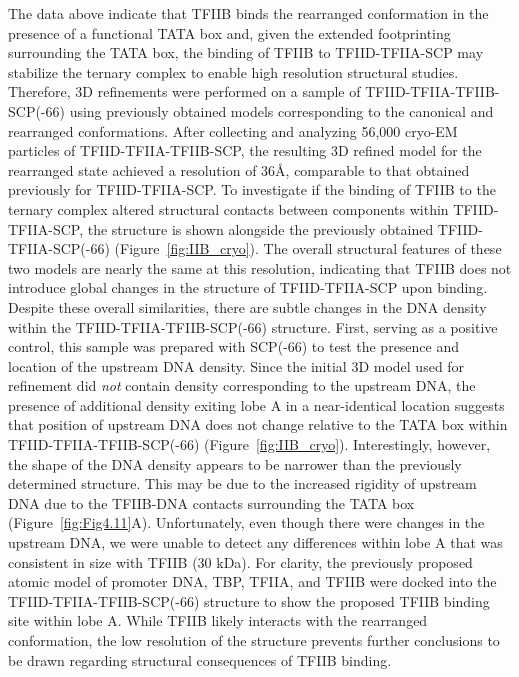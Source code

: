 \indent The data above indicate that TFIIB binds the rearranged conformation in the presence of a functional TATA box and, given the extended footprinting surrounding the TATA box, the binding of TFIIB to TFIID-TFIIA-SCP may stabilize the ternary complex to enable high resolution structural studies. Therefore, 3D refinements were performed on a sample of TFIID-TFIIA-TFIIB-SCP(-66) using previously obtained models corresponding to the canonical and rearranged conformations. After collecting and analyzing 56,000 cryo-EM particles of TFIID-TFIIA-TFIIB-SCP, the resulting 3D refined model for the rearranged state achieved a resolution of 36\AA, comparable to that obtained previously for TFIID-TFIIA-SCP. To investigate if the binding of TFIIB to the ternary complex altered structural contacts between components within TFIID-TFIIA-SCP, the structure is shown alongside the previously obtained TFIID-TFIIA-SCP(-66) (Figure~\ref{fig:IIB_cryo}). The overall structural features of these two models are nearly the same at this resolution, indicating that TFIIB does not introduce global changes in the structure of TFIID-TFIIA-SCP upon binding. \\
\indent Despite these overall similarities, there are subtle changes in the DNA density within the TFIID-TFIIA-TFIIB-SCP(-66) structure. First, serving as a positive control, this sample was prepared with SCP(-66) to test the presence and location of the upstream DNA density. Since the initial 3D model used for refinement did \emph{not} contain density corresponding to the upstream DNA, the presence of additional density exiting lobe A in a near-identical location suggests that position of upstream DNA does not change relative to the TATA box within TFIID-TFIIA-TFIIB-SCP(-66) (Figure~\ref{fig:IIB_cryo}). Interestingly, however, the shape of the DNA density appears to be narrower than the previously determined structure. This may be due to the increased rigidity of upstream DNA due to the TFIIB-DNA contacts surrounding the TATA box (Figure~\ref{fig:Fig4.11}A). Unfortunately, even though there were changes in the upstream DNA, we were unable to detect any differences within lobe A that was consistent in size with TFIIB (30 kDa). For clarity, the previously proposed atomic model of promoter DNA, TBP, TFIIA, and TFIIB were docked into the TFIID-TFIIA-TFIIB-SCP(-66) structure to show the proposed TFIIB binding site within lobe A. While TFIIB likely interacts with the rearranged conformation, the low resolution of the structure prevents further conclusions to be drawn regarding structural consequences of TFIIB binding. \\
